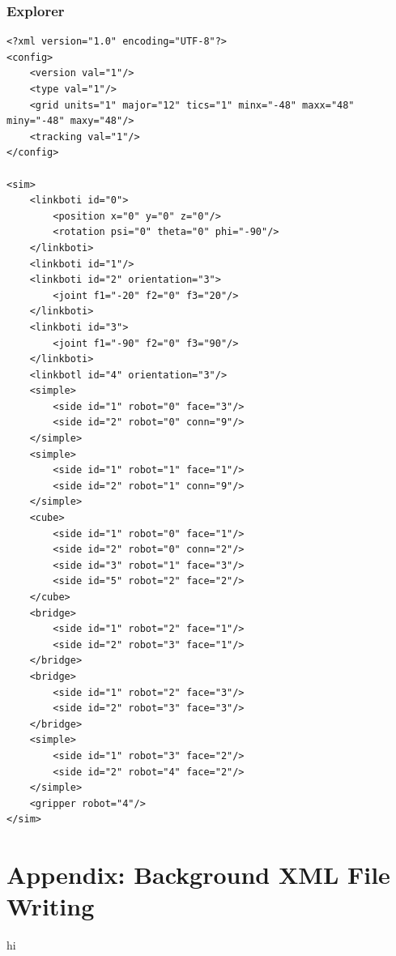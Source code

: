 \documentclass{article}
\begin{document}
\subsubsection{Explorer}
\begin{verbatim}
<?xml version="1.0" encoding="UTF-8"?>
<config>
    <version val="1"/>
    <type val="1"/>
	<grid units="1" major="12" tics="1" minx="-48" maxx="48" miny="-48" maxy="48"/>
    <tracking val="1"/>
</config>

<sim>
    <linkboti id="0">
        <position x="0" y="0" z="0"/>
        <rotation psi="0" theta="0" phi="-90"/>
    </linkboti>
    <linkboti id="1"/>
    <linkboti id="2" orientation="3">
        <joint f1="-20" f2="0" f3="20"/>
    </linkboti>
    <linkboti id="3">
        <joint f1="-90" f2="0" f3="90"/>
    </linkboti>
    <linkbotl id="4" orientation="3"/>
    <simple>
        <side id="1" robot="0" face="3"/>
        <side id="2" robot="0" conn="9"/>
    </simple>
    <simple>
        <side id="1" robot="1" face="1"/>
        <side id="2" robot="1" conn="9"/>
    </simple>
    <cube>
        <side id="1" robot="0" face="1"/>
        <side id="2" robot="0" conn="2"/>
        <side id="3" robot="1" face="3"/>
        <side id="5" robot="2" face="2"/>
    </cube>
    <bridge>
        <side id="1" robot="2" face="1"/>
        <side id="2" robot="3" face="1"/>
    </bridge>
    <bridge>
        <side id="1" robot="2" face="3"/>
        <side id="2" robot="3" face="3"/>
    </bridge>
    <simple>
        <side id="1" robot="3" face="2"/>
        <side id="2" robot="4" face="2"/>
    </simple>
    <gripper robot="4"/>
</sim>
\end{verbatim}

\newpage
\section{Appendix: Background XML File Writing}
\label{appendix:backgroundxml}
hi
\end{document}
